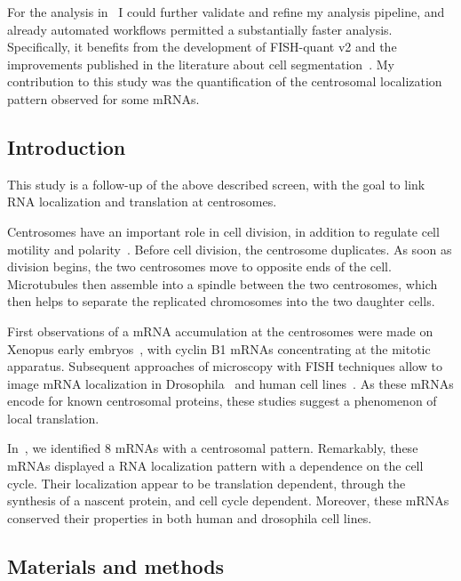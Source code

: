 For the analysis in~\cite{safieddine_choreography_2021} I could further validate and refine my analysis pipeline, and already automated workflows permitted a substantially faster analysis.
Specifically, it benefits from the development of FISH-quant v2 and the improvements published in the literature about cell segmentation~\cite{Imbert_fq_2022, stringer_cellpose_2021}.
My contribution to this study was the quantification of the centrosomal localization pattern observed for some \ac{mRNA}s.

\subsection{Introduction}
\label{subsec:introduction_centrosomal}

This study is a follow-up of the above described screen, with the goal to link RNA localization and translation at centrosomes.

Centrosomes have an important role in cell division, in addition to regulate cell motility and polarity~\cite{wu_2017}.
Before cell division, the centrosome duplicates.
As soon as division begins, the two centrosomes move to opposite ends of the cell.
Microtubules then assemble into a spindle between the two centrosomes, which then helps to separate the replicated chromosomes into the two daughter cells.

First observations of a \ac{mRNA} accumulation at the centrosomes were made on Xenopus early embryos~\cite{Groisman_2000}, with cyclin B1 \ac{mRNA}s concentrating at the mitotic apparatus.
Subsequent approaches of microscopy with \ac{FISH} techniques allow to image \ac{mRNA} localization in Drosophila~\cite{lecuyer_global_2007, wilk_diverse_2016} and human cell lines~\cite{Sepulveda_2018, CHOUAIB_2020}.
As these \ac{mRNA}s encode for known centrosomal proteins, these studies suggest a phenomenon of local translation.

In~\cite{safieddine_choreography_2021}, we identified 8 \ac{mRNA}s with a centrosomal pattern.
Remarkably, these \ac{mRNA}s displayed a RNA localization pattern with a dependence on the cell cycle.
Their localization appear to be translation dependent, through the synthesis of a nascent protein, and cell cycle dependent.
Moreover, these \ac{mRNA}s conserved their properties in both human and drosophila cell lines.

\subsection{Materials and methods}
\label{subsec:materials_centrosomal}

